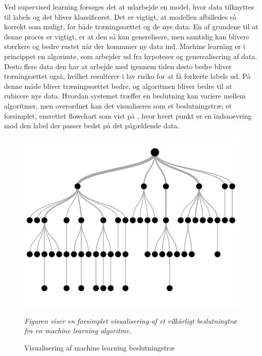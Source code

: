 Ved supervised learning forsøges det at udarbejde en model, hvor data tilknyttes til labels og det bliver klassificeret. Det er vigtigt, at modellen afbilledes så korrekt som muligt, for både træningssættet og de nye data. En af grundene til at denne proces er vigtigt, er at den så kan generelisere, men samtidig kan blivere stærkere og bedre rustet når der kommmer ny data ind. Machine learning er i princippet en algorimte, som arbejder ud fra hypoteser og generealisering af data. Desto flere data den har at arbejde med igennem tiden desto bedre bliver træningsættet også, hvilket resulterer i lav risiko for at få forkerte labels ud. På denne måde bliver træningssættet bedre, og algoritmen bliver bedre til at rubicere nye data.\cite{DIKU2010} Hvordan systemet træffer en beslutning kan variere mellem algoritmer, men overordnet kan det visualiseres som et beslutningstræ; et forsimplet, ensrettet flowchart som vist på , hvor hvert punkt er en indsnævring mod den label der passer bedst på det pågældende data.\cite{Barber2012}

\begin{figure}[H]
	\centering
	\includegraphics[scale=.4]{figures/dt.png}
	\flushleft 
	\caption{Visualisering af machine learning beslutningstræ}
	\label{dt}
	\flushleft
	\textit{Figuren viser en forsimplet visualisering af et vilkårligt beslutningtræ fra en machine learning algoritme.\cite{Saraswat2016}}
\end{figure}

